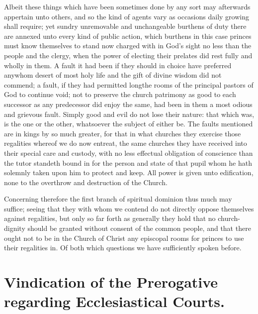 Albeit these things which have been sometimes done by any sort may afterwards appertain unto others, and so the kind of agents vary as occasions daily growing shall require; yet sundry unremovable and unchangeable burthens of duty there are annexed unto every kind of public action, which burthens in this case princes must know themselves to stand now charged with in God’s sight no less than the people and the clergy, when the power of electing their prelates did rest fully and wholly in them. A fault it had been if they should in choice have preferred anywhom desert of most holy life and the gift of divine wisdom did not commend; a fault, if they had permitted longthe rooms of the principal pastors of God to continue void; not to preserve the church patrimony as good to each successor as any predecessor did enjoy the same, had been in them a most odious and grievous fault. Simply good and evil do not lose their nature: that which was, is the one or the other, whatsoever the subject of either be. The faults mentioned are in kings by so much greater, for that in what churches they exercise those regalities whereof we do now entreat, the same churches they have received into their special care and custody, with no less effectual obligation of conscience than the tutor standeth bound in for the person and state of that pupil whom he hath solemnly taken upon him to protect and keep. All power is given unto edification, none to the overthrow and destruction of the Church.

Concerning therefore the first branch of spiritual dominion  thus much may suffice; seeing that they with whom we contend do not directly oppose themselves against regalities, but only so far forth as generally they hold that no church-dignity should be granted without consent of the common people, and that there ought not to be in the Church of Christ any episcopal rooms for princes to use their regalities in. Of both which questions we have sufficiently spoken before.


\section*{Vindication of the Prerogative regarding Ecclesiastical Courts.}


